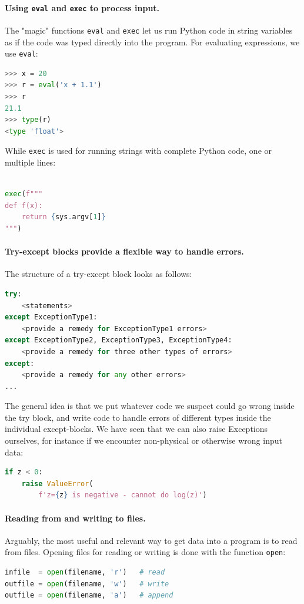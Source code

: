 \documentclass[graybox,envcountchap,sectrefs,final]{svmonodo}
\begin{document}
\paragraph{Using  \texttt{eval} and \texttt{exec} to process input.}
The "magic" functions \texttt{eval} and \texttt{exec} let us run Python code in string variables as if the code was typed directly
into the program. For evaluating expressions, we use \texttt{eval}:
\begin{lstlisting}[language=Python,style=blue1]
>>> x = 20
>>> r = eval('x + 1.1')
>>> r
21.1
>>> type(r)
<type 'float'>
\end{lstlisting}
While \texttt{exec} is used for running strings with complete Python code, one or multiple lines:
\begin{lstlisting}[language=Python,style=blue1]

exec(f"""
def f(x):
    return {sys.argv[1]}
""")
\end{lstlisting}


\paragraph{Try-except blocks provide a flexible way to handle errors.}
The structure of a try-except block looks as follows:
\begin{lstlisting}[language=Python,style=blue1]
try:
    <statements>
except ExceptionType1:
    <provide a remedy for ExceptionType1 errors>
except ExceptionType2, ExceptionType3, ExceptionType4:
    <provide a remedy for three other types of errors>
except:
    <provide a remedy for any other errors>
...
\end{lstlisting}
The general idea is that we put whatever code we suspect could go wrong inside the try block, and write code to
handle errors of different types inside the individual except-blocks. We have seen that we can also raise
Exceptions ourselves, for instance if we encounter non-physical or otherwise wrong input data:
\begin{lstlisting}[language=Python,style=blue1]
if z < 0:
    raise ValueError(
        f'z={z} is negative - cannot do log(z)')
\end{lstlisting}

\paragraph{Reading from and writing to files.}
Arguably, the most useful and relevant way to get data into a program is to read from files. Opening files for
reading or writing is done with the function \texttt{open}:
\begin{lstlisting}[language=Python,style=blue1]
infile  = open(filename, 'r')   # read
outfile = open(filename, 'w')   # write
outfile = open(filename, 'a')   # append
\end{lstlisting}
\end{document}
